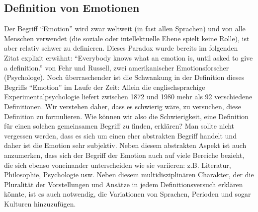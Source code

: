 \subsection{Definition von Emotionen} \label{definition-emotionen}




Der Begriff ``Emotion'' wird zwar weltweit  (in fast allen Sprachen) und von alle Menschen verwendet (die soziale oder intellektuelle Ebene spielt keine Rolle), ist aber relativ schwer zu definieren. 
Dieses Paradox wurde bereits im folgenden Zitat explizit erw{\"a}hnt: 
``Everybody knows what an emotion is, until asked to give a definition.''\cite{fehr_russel_1984} von Fehr und Russell, zwei amerikanischer Emotionsforscher (Psychologe). 
Noch {\"u}berraschender ist die Schwankung in der Definition dieses Begriffs ``Emotion'' im Laufe der Zeit: Allein die englischsprachige Experimentalpsychologie\cite{plamper12} liefert zwischen 1872 und 1980 mehr als 92 verschiedene Definitionen. 
Wir verstehen daher, dass es schwierig w{\"a}re, zu versuchen, diese Definition zu formulieren.  
Wie k{\"o}nnen wir also die Schwierigkeit, eine Definition f{\"u}r einen solchen gemeinsamen Begriff zu finden, erkl{\"a}ren? 
Man sollte nicht vergessen werden, dass es sich um einen eher abstrakten Begriff handelt und daher ist die Emotion sehr subjektiv. 
Neben diesem abstrakten Aspekt ist auch anzumerken, dass sich der Begriff der Emotion auch auf viele Bereiche bezieht, die sich ebenso voneinander unterscheiden wie sie variieren: z.B. Literatur, Philosophie, Psychologie usw. 
Neben diesem multidisziplin{\"a}ren Charakter, der die Pluralit{\"a}t der Vorstellungen und Ans{\"a}tze in jedem Definitionsversuch erkl{\"a}ren k{\"o}nnte, ist es auch notwendig, die Variationen von Sprachen, Perioden und sogar Kulturen hinzuzuf{\"u}gen. \\



